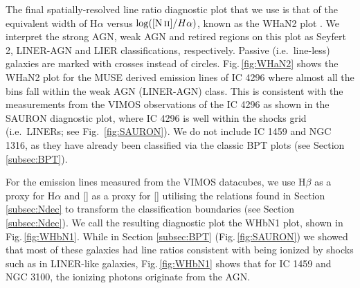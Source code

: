 		The final spatially-resolved line ratio diagnostic plot that we use is that of the equivalent width of H$\alpha$ versus $\log([\text{\ion{N}{ii}}]/H\alpha)$, known as the WHaN2 plot \citep{CidFernandes2011}. We interpret the strong AGN, weak AGN and retired regions on this plot as Seyfert 2, LINER-AGN and LIER classifications, respectively. Passive (i.e.\ line-less) galaxies are marked with crosses instead of circles. Fig.\,\ref{fig:WHaN2} shows the WHaN2 plot for the MUSE derived emission lines of IC 4296 where almost all the bins fall within the weak AGN (LINER-AGN) class. This is consistent with the measurements from the VIMOS observations of the IC 4296 as shown in the SAURON diagnostic plot, where IC 4296 is well within the shocks grid (i.e.\ LINERs; see Fig.\ \ref{fig:SAURON}). We do not include IC 1459 and NGC 1316, as they have already been classified via the classic BPT plots (see Section \ref{subsec:BPT}). 

		For the emission lines measured from the VIMOS datacubes, we use H$\beta$ as a proxy for H$\alpha$ and [] as a proxy for [] utilising the relations found in Section \ref{subsec:Ndec} to transform the classification boundaries (see Section \ref{subsec:Ndec}). We call the resulting diagnostic plot the WHbN1 plot, shown in Fig.\,\ref{fig:WHbN1}. While in Section \ref{subsec:BPT} (Fig.\,\ref{fig:SAURON}) we showed that most of these galaxies had line ratios consistent with being ionized by shocks such as in LINER-like galaxies, Fig.\,\ref{fig:WHbN1} shows that for IC 1459 and NGC 3100, the ionizing photons originate from the AGN. 

		\FloatBarrier
	
